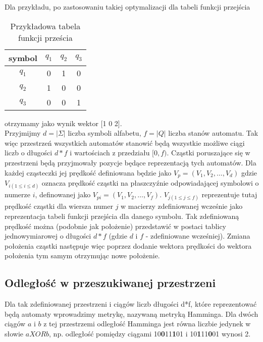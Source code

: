 \documentclass{llncs}
\begin{document}
Dla przykładu, po zastosowaniu takiej optymalizacji dla tabeli funkcji przejścia 
\begin{table}[]
\centering
\begin{tabular}{c|c|c|c|}
symbol                   & $q_{1}$ & $q_{2}$ & $q_{3}$ \\ \hline
\multicolumn{1}{c|}{$q_{1}$} & 0  & 1  & 0  \\ \hline
\multicolumn{1}{c|}{$q_{2}$} & 1  & 0  & 0  \\ \hline
\multicolumn{1}{c|}{$q_{3}$} & 0  & 0  & 1  \\ \hline
\end{tabular}
\vspace{0.5cm}
\caption{Przykładowa tabela funkcji prześcia}
\end{table}

otrzymamy jako wynik wektor [1 0 2].\\

Przyjmijmy $d = |\Sigma|$ liczba symboli alfabetu, $f = |Q|$ liczba stanów automatu. Tak więc przestrzeń wszystkich automatów stanowić będą wszystkie możliwe ciągi liczb o długości $d*f$ i wartościach z przedziału $[0, f)$. Cząstki poruszające się w przestrzeni będą przyjmowały pozycje będące reprezentacją tych automatów. Dla każdej cząsteczki jej prędkość definiowana będzie jako $V_{p} = (V_{1}, V_{2}, …, V_{d})$ gdzie $V_{i (1 \leq i \leq d)}$ oznacza prędkość cząstki na płaszczyźnie odpowiadającej symbolowi o numerze $i$, definowanej jako $V_{pi} = (V_{1}, V_{2}, …, V_{f})$. $V_{j (1 \leq j \leq f)}$ reprezentuje tutaj prędkość cząstki dla wiersza numer $j$ w macierzy zdefiniowanej wcześnie jako reprezentacja tabeli funkcji przejścia dla danego symbolu. Tak zdefiniowaną prędkość można (podobnie jak położenie) przedstawić w postaci tablicy jednowymiarowej o długości $d*f$ (gdzie $d$ i $f$ - zdefiniowane wcześniej). Zmiana położenia cząstki następuje więc poprzez dodanie wektora prędkości do wektora położenia tym samym otrzymując nowe położenie.

\subsection{Odległość w przeszukiwanej przestrzeni}

Dla tak zdefiniowanej przestrzeni i ciągów liczb długości d*f, które reprezentować będą automaty wprowadzimy metrykę, nazywaną metryką Hamminga. Dla dwóch ciągów $a$ i $b$ z tej przestrzemi odległość Hamminga jest równa liczbie jedynek w słowie $a XOR b$, np. odległość pomiędzy ciągami 10\textbf{0}11\textbf{1}01 i 10\textbf{1}11\textbf{0}01 wynosi 2.
\end{document}
